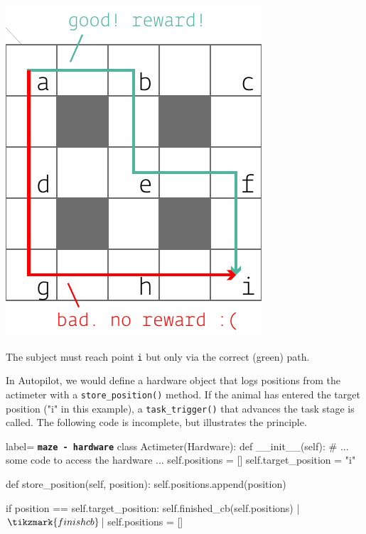 \documentclass[nohyper, justified, notitlepage, marginals=raggedright,twoside=false,debug]{tufte-autopilot}
\begin{document}
\begin{marginfigure}[0.65cm]
\includegraphics[]{figures/side_18_maze.pdf}
\caption{The subject must reach point \texttt{i} but only via the correct (green) path.}
\label{fig:maze}
\end{marginfigure}

In Autopilot, we would define a hardware object that logs positions from the actimeter with a \texttt{store_position()} method. If the animal has entered the target position ("i" in this example), a \texttt{task_trigger()} that advances the task stage is called. The following code is incomplete, but illustrates the principle.

\begin{pythoncode*}{label= \texttt{\textbf{maze - hardware}}}
class Actimeter(Hardware):
    def __init__(self):
        # ... some code to access the hardware ...
        self.positions = []
        self.target_position = "i"
        
    def store_position(self, position):
        self.positions.append(position)
        
        if position == self.target_position:
            self.finished_cb(self.positions) |$\tikzmark{finishcb}$|
            self.positions = []
\end{pythoncode*}
%
\end{document}
